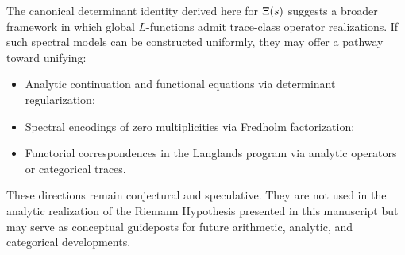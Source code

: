 The canonical determinant identity derived here for \( \Xi(s) \) suggests a broader framework in which global \( L \)-functions admit trace-class operator realizations. If such spectral models can be constructed uniformly, they may offer a pathway toward unifying:

\begin{itemize}
  \item Analytic continuation and functional equations via determinant regularization;
  \item Spectral encodings of zero multiplicities via Fredholm factorization;
  \item Functorial correspondences in the Langlands program via analytic operators or categorical traces.
\end{itemize}

These directions remain conjectural and speculative. They are not used in the analytic realization of the Riemann Hypothesis presented in this manuscript but may serve as conceptual guideposts for future arithmetic, analytic, and categorical developments.
